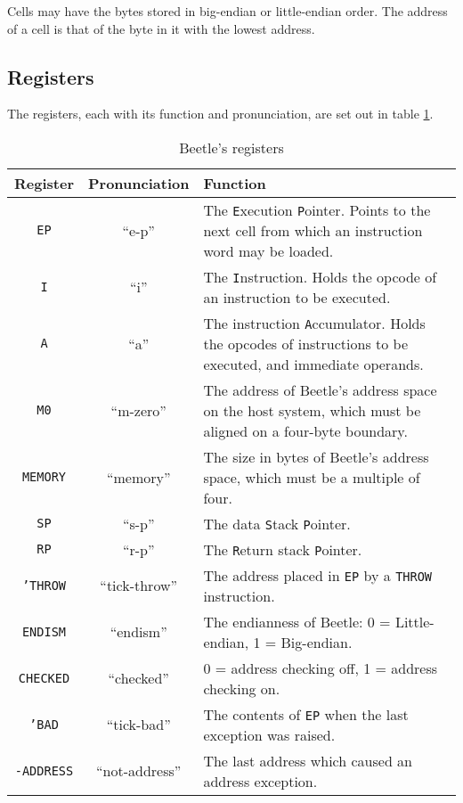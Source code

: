 Cells may have the bytes stored in big-endian or little-endian order. The
address of a cell is that of the byte in it with the lowest address.


\subsection{Registers}
\label{registers}

The registers, each with its function and pronunciation, are set out in table
\ref{regtable}.

\begin{table}[htbp]
\begin{center}
\begin{tabular}{|c|c|p{3.75in}|} \hline
\rule[-2mm]{0mm}{6mm}\bf Register & \bf Pronunciation & \bf Function \\
    \hline
{\tt EP} & ``e-p'' & The {\tt E}xecution {\tt P}ointer. Points to the next
    cell from which an instruction word may be loaded. \\ \hline
{\tt I} & ``i'' & The {\tt I}nstruction. Holds the opcode of an instruction
    to be executed. \\ \hline
{\tt A} & ``a'' & The instruction {\tt A}ccumulator. Holds the opcodes of
    instructions to be executed, and immediate operands. \\ \hline
{\tt M0} & ``m-zero'' & The address of Beetle's address space on the host
    system, which must be aligned on a four-byte boundary. \\ \hline
{\tt MEMORY} & ``memory'' & The size in bytes of Beetle's address space,
    which must be a multiple of four. \\ \hline
{\tt SP} & ``s-p'' & The data {\tt S}tack {\tt P}ointer. \\ \hline
{\tt RP} & ``r-p'' & The {\tt R}eturn stack {\tt P}ointer. \\ \hline
{\tt 'THROW} & ``tick-throw'' & The address placed in {\tt EP} by a {\tt THROW}
    instruction. \\ \hline
{\tt ENDISM} & ``endism'' & The endianness of Beetle: 0 = Little-endian,
    1 = Big-endian. \\ \hline
{\tt CHECKED} & ``checked'' & 0 = address checking off, 1 = address checking
    on. \\ \hline
{\tt 'BAD} & ``tick-bad'' & The contents of {\tt EP} when the last exception
    was raised. \\ \hline
{\tt -ADDRESS} & ``not-address'' & The last address which caused an address
    exception. \\ \hline
\end{tabular}
\end{center}
\vspace{-2mm}
\caption{\label{regtable}Beetle's registers}
\end{table}

